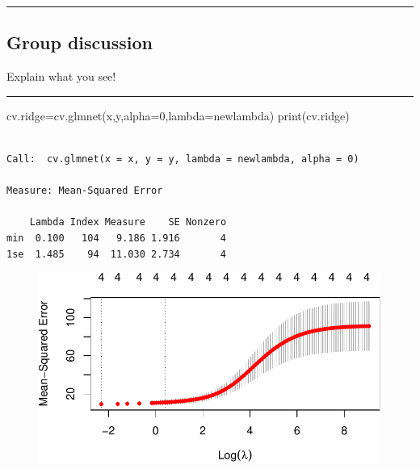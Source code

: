 \documentclass[
  letterpaper,
  DIV=11,
  numbers=noendperiod]{scrartcl}
\newenvironment{Shaded}{\begin{snugshade}}{\end{snugshade}}
\newcommand{\AttributeTok}[1]{\textcolor[rgb]{0.40,0.45,0.13}{#1}}
\newcommand{\CommentTok}[1]{\textcolor[rgb]{0.37,0.37,0.37}{#1}}
\newcommand{\DecValTok}[1]{\textcolor[rgb]{0.68,0.00,0.00}{#1}}
\newcommand{\FunctionTok}[1]{\textcolor[rgb]{0.28,0.35,0.67}{#1}}
\newcommand{\NormalTok}[1]{\textcolor[rgb]{0.00,0.23,0.31}{#1}}
\newcommand{\OtherTok}[1]{\textcolor[rgb]{0.00,0.23,0.31}{#1}}
\begin{document}
\begin{center}\rule{0.5\linewidth}{0.5pt}\end{center}

\hypertarget{group-discussion-1}{%
\subsection{Group discussion}\label{group-discussion-1}}

Explain what you see!

\begin{center}\rule{0.5\linewidth}{0.5pt}\end{center}

\begin{Shaded}
\begin{Highlighting}[]
\NormalTok{cv.ridge}\OtherTok{=}\FunctionTok{cv.glmnet}\NormalTok{(x,y,}\AttributeTok{alpha=}\DecValTok{0}\NormalTok{,}\AttributeTok{lambda=}\NormalTok{newlambda)}
\FunctionTok{print}\NormalTok{(cv.ridge)}
\end{Highlighting}
\end{Shaded}

\begin{verbatim}

Call:  cv.glmnet(x = x, y = y, lambda = newlambda, alpha = 0) 

Measure: Mean-Squared Error 

    Lambda Index Measure    SE Nonzero
min  0.100   104   9.186 1.916       4
1se  1.485    94  11.030 2.734       4
\end{verbatim}

\begin{Shaded}
\end{Shaded}

\begin{figure}[H]

{\centering \includegraphics{L7_files/figure-pdf/unnamed-chunk-14-1.pdf}

}

\end{figure}
\end{document}
